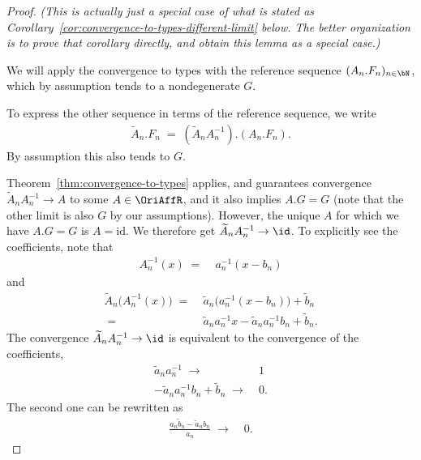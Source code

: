 \begin{proof}
  \emph{(This is actually just a special case of what is stated as
  Corollary~\ref{cor:convergence-to-types-different-limit} below.
  The better organization is to prove that corollary
  directly, and obtain this lemma as a special case.)}

  We will apply the convergence to types with the reference sequence
  $(A_n.F_n)_{n \in \bN}$, which by assumption tends to a
  nondegenerate $G$.

  To express the other sequence in terms of the reference sequence, we write
  \begin{align*}
    \widetilde{A}_n.F_n \; = \; (\widetilde{A}_n A_n^{-1}).(A_n.F_n) .
  \end{align*}
  By assumption this also tends to $G$.

  Theorem~\ref{thm:convergence-to-types} applies, and guarantees convergence
  $\widetilde{A}_n A_n^{-1} \to A$ to some $A \in \OriAffR$,
  and it also implies $A.G = G$ (note that the other limit is also $G$
  by our assumptions).
  However, the unique $A$ for which we have $A.G = G$ is $A = \mathrm{id}$.
  We therefore get $\widetilde{A}_n A_n^{-1} \to \id$.
  To explicitly see the coefficients, note that
  \begin{align*}
    A_n^{-1}(x) \; = \; & a_n^{-1} (x - b_n)
  \end{align*}
  and
  \begin{align*}
    \widetilde{A}_n \big( A_n^{-1}(x) \big)
    \; = \; & \tilde{a}_n \big(a_n^{-1} (x - b_n)\big) + \tilde{b}_n \\
    \; = \; & \tilde{a}_n a_n^{-1} x - \tilde{a}_n a_n^{-1} b_n + \tilde{b}_n .
  \end{align*}
  The convergence $\widetilde{A}_n A_n^{-1} \to \id$ is equivalent to
  the convergence of the coefficients,
  \begin{align*}
    \tilde{a}_n a_n^{-1} \; \longrightarrow \; & 1 \\
    - \tilde{a}_n a_n^{-1} b_n + \tilde{b}_n \; \longrightarrow \; & 0 .
  \end{align*}
  The second one can be rewritten as
  \begin{align*}
    \frac{a_n \tilde{b}_n - \tilde{a}_n b_n}{a_n} \; \longrightarrow \; & 0 .
  \end{align*}
\end{proof}

